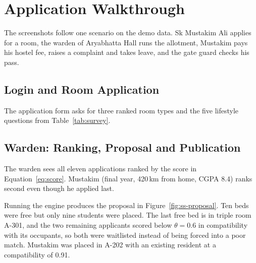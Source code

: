 \documentclass[11pt,a4paper]{report}
\begin{document}
\section{Application Walkthrough}
The screenshots follow one scenario on the demo data. Sk Mustakim Ali applies for a room, the warden of Aryabhatta Hall runs the allotment, Mustakim pays his hostel fee, raises a complaint and takes leave, and the gate guard checks his pass.

\subsection{Login and Room Application}

The application form asks for three ranked room types and the five lifestyle questions from Table~\ref{tab:survey}.


\subsection{Warden: Ranking, Proposal and Publication}
The warden sees all eleven applications ranked by the score in Equation~\ref{eq:score}. Mustakim (final year, 420\,km from home, CGPA 8.4) ranks second even though he applied last.


Running the engine produces the proposal in Figure~\ref{fig:ss-proposal}. Ten beds were free but only nine students were placed. The last free bed is in triple room A-301, and the two remaining applicants scored below $\theta = 0.6$ in compatibility with its occupants, so both were waitlisted instead of being forced into a poor match. Mustakim was placed in A-202 with an existing resident at a compatibility of 0.91.


\end{document}
